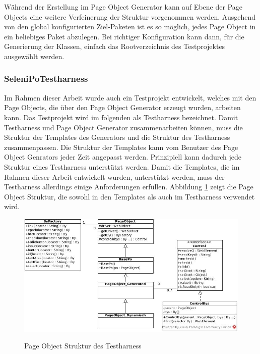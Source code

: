 Während der Erstellung im Page Object Generator kann auf Ebene der Page Objects eine weitere Verfeinerung der Struktur vorgenommen werden. Ausgehend von den global konfigurierten Ziel-Paketen ist es so möglich, jedes Page Object in ein beliebiges Paket abzulegen.
Bei richtiger Konfiguration kann dann, für die Generierung der Klassen, einfach das Rootverzeichnis des Testprojektes ausgewählt werden.

\subsubsection{SeleniPoTestharness}
\label{sec:selenipotestharness}

Im Rahmen dieser Arbeit wurde auch ein Testprojekt entwickelt, welches mit den Page Objects, die über den Page Object Generator erzeugt wurden, arbeiten kann.
Das Testprojekt wird im folgenden als Testharness bezeichnet.
Damit Testharness und Page Object Generator zusammenarbeiten können, muss die Struktur der Templates des Generators und die Struktur des Testharness zusammenpassen.
Die Struktur der Templates kann vom Benutzer des Page Object Genrators jeder Zeit angepasst werden. Prinzipiell kann dadurch jede Struktur eines Testharness unterstützt werden.
Damit die Templates, die im Rahmen dieser Arbeit entwickelt wurden, unterstützt werden, muss der Testharness allerdings einige Anforderungen erfüllen.
Abbildung \ref{fig:strukturTestharness} zeigt die Page Object Struktur, die sowohl in den Templates als auch im Testharness verwendet wird.
\begin{figure}[htb]
  \centering  
  \includegraphics[scale=0.5]{img/strukturTestharness.jpg}\\
  \caption{Page Object Struktur des Testharness}
  \label{fig:strukturTestharness}
\end{figure}

